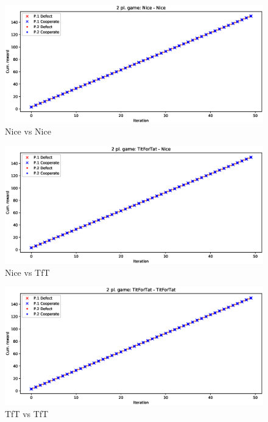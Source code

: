 \documentclass[journal,a4paper,10pt,twoside]{IEEEtran} %
\begin{document}
\begin{figure}[ht]
    \centering
    \includegraphics[width=1\columnwidth]{../img/ipd2p/ipd2p-rewards-Nice-Nice}
    \caption{Nice vs Nice}
    \label{fig:nicevsnice}
\end{figure}

\begin{figure}[ht]
    \centering
    \includegraphics[width=1\columnwidth]{../img/ipd2p/ipd2p-rewards-TitForTat-Nice}
    \caption{Nice vs TfT}
    \label{fig:nicevstft}
\end{figure}

\begin{figure}[ht]
    \centering
    \includegraphics[width=1\columnwidth]{../img/ipd2p/ipd2p-rewards-TitForTat-TitForTat}
    \caption{TfT vs TfT}
    \label{fig:tftvstft}
\end{figure}
\end{document}
